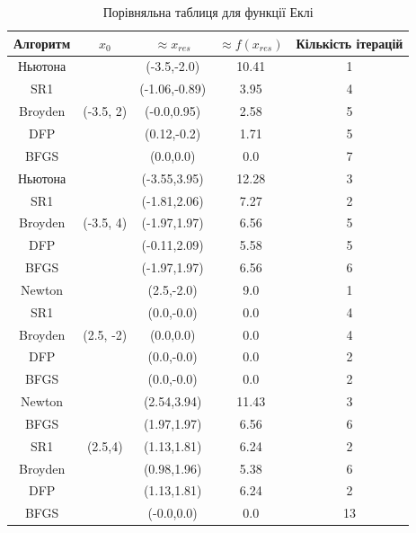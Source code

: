 \clearpage
\begin{table}[ht!]
    \centering
    \begin{tabular}{|c|c|c|c|c|}
        \hline
        \textbf{Алгоритм} & $x_{0}$ & $\approx x_{res}$ & $\approx f(x_{res})$ & \textbf{Кількість ітерацій}  \\
        \hline
        Ньютона & \multirow{5}{*}{(-3.5, 2)} & (-3.5,-2.0) & 10.41 & 1 \\
        \cline{1-1} \cline{3-5}
        SR1 & & (-1.06,-0.89) & 3.95 & 4 \\
        \cline{1-1} \cline{3-5}
        Broyden & & (-0.0,0.95) & 2.58 & 5 \\
        \cline{1-1} \cline{3-5}
        DFP & & (0.12,-0.2) & 1.71 & 5 \\
        \cline{1-1} \cline{3-5}
        BFGS & & (0.0,0.0) & 0.0 & 7 \\
        \hline
        Ньютона & \multirow{5}{*}{(-3.5, 4)} & (-3.55,3.95) & 12.28 & 3 \\
        \cline{1-1} \cline{3-5}
        SR1 & & (-1.81,2.06) & 7.27 & 2 \\
        \cline{1-1} \cline{3-5}
        Broyden & & (-1.97,1.97) & 6.56 & 5 \\
        \cline{1-1} \cline{3-5}
        DFP & & (-0.11,2.09) & 5.58 & 5 \\
        \cline{1-1} \cline{3-5}
        BFGS & & (-1.97,1.97) & 6.56 & 6 \\
        \hline
        Newton & \multirow{5}{*}{(2.5, -2)} & (2.5,-2.0) & 9.0 & 1 \\
        \cline{1-1} \cline{3-5}
        SR1 & & (0.0,-0.0) & 0.0 & 4 \\
        \cline{1-1} \cline{3-5}
        Broyden & & (0.0,0.0) & 0.0 & 4 \\
        \cline{1-1} \cline{3-5}
        DFP & & (0.0,-0.0) & 0.0 & 2 \\
        \cline{1-1} \cline{3-5}
        BFGS & & (0.0,-0.0) & 0.0 & 2 \\
        \hline
        Newton & \multirow{5}{*}{(2.5,4)} & (2.54,3.94) & 11.43 & 3 \\
        \cline{1-1} \cline{3-5}
        BFGS & & (1.97,1.97) & 6.56 & 6 \\
        \cline{1-1} \cline{3-5}
        SR1 & & (1.13,1.81) & 6.24 & 2 \\
        \cline{1-1} \cline{3-5}
        Broyden & & (0.98,1.96) & 5.38 & 6 \\
        \cline{1-1} \cline{3-5}
        DFP & & (1.13,1.81) & 6.24 & 2 \\
        \cline{1-1} \cline{3-5}
        BFGS & & (-0.0,0.0) & 0.0 & 13 \\
        \hline
    \end{tabular}
    \caption{Порівняльна таблиця для функції Еклі}
\end{table}

